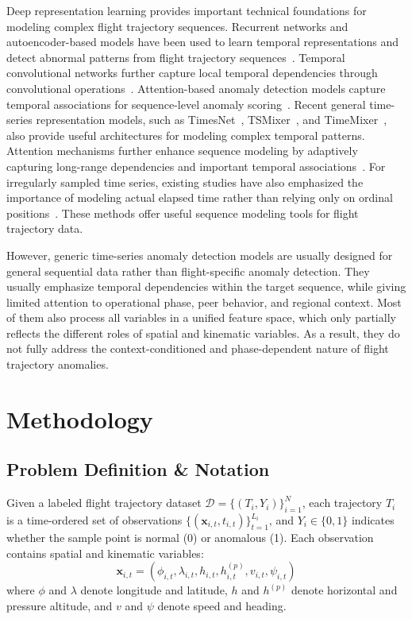 \documentclass[iicol,pdflatex,sn-basic,Numbered]{sn-jnl}%
\theoremstyle{thmstyleone}%
\theoremstyle{thmstyletwo}%
\theoremstyle{thmstylethree}%
\begin{document}
Deep representation learning provides important technical foundations for modeling complex flight trajectory sequences.
Recurrent networks and autoencoder-based models have been used to learn temporal representations and detect abnormal patterns from flight trajectory sequences~\cite{chevrot2022cae,LUO2024103840}. 
Temporal convolutional networks further capture local temporal dependencies through convolutional operations~\cite{HUANG2025103478}. 
Attention-based anomaly detection models capture temporal associations for sequence-level anomaly scoring~\cite{xu2022anomalytransformer}. 
Recent general time-series representation models, such as TimesNet~\cite{wu2023timesnet}, TSMixer~\cite{chen2023tsmixer}, and TimeMixer~\cite{wang2024timemixer}, also provide useful architectures for modeling complex temporal patterns.
Attention mechanisms further enhance sequence modeling by adaptively capturing long-range dependencies and important temporal associations~\cite{xu2022anomalytransformer}. 
For irregularly sampled time series, existing studies have also emphasized the importance of modeling actual elapsed time rather than relying only on ordinal positions~\cite{kreindler2016effects,li2020learning,kidger2020neuralcde,shukla2021mtnet,braun2022sampling}. 
These methods offer useful sequence modeling tools for flight trajectory data.

However, generic time-series anomaly detection models are usually designed for general sequential data rather than flight-specific anomaly detection.
They usually emphasize temporal dependencies within the target sequence, while giving limited attention to operational phase, peer behavior, and regional context.
Most of them also process all variables in a unified feature space, which only partially reflects the different roles of spatial and kinematic variables.
As a result, they do not fully address the context-conditioned and phase-dependent nature of flight trajectory anomalies.

\section{Methodology}\label{sec:methodology}

\subsection{Problem Definition \& Notation}

Given a labeled flight trajectory dataset $\mathcal{D} = \{(T_i, Y_i)\}_{i=1}^N$, each trajectory $T_i$ is a time-ordered set of observations $\{(\mathbf{x}_{i,t}, t_{i,t})\}_{t=1}^{L_i}$, and $Y_i \in \{0,1\}$ indicates whether the sample point is normal (0) or anomalous (1).
Each observation contains spatial and kinematic variables:
\begin{equation}
\mathbf{x}_{i,t} = (\phi_{i,t}, \lambda_{i,t}, h_{i,t}, h^{(p)}_{i,t}, v_{i,t}, \psi_{i,t})
\end{equation}
where $\phi$ and $\lambda$ denote longitude and latitude, $h$ and $h^{(p)}$ denote horizontal and pressure altitude, and $v$ and $\psi$ denote speed and heading.
\end{document}
